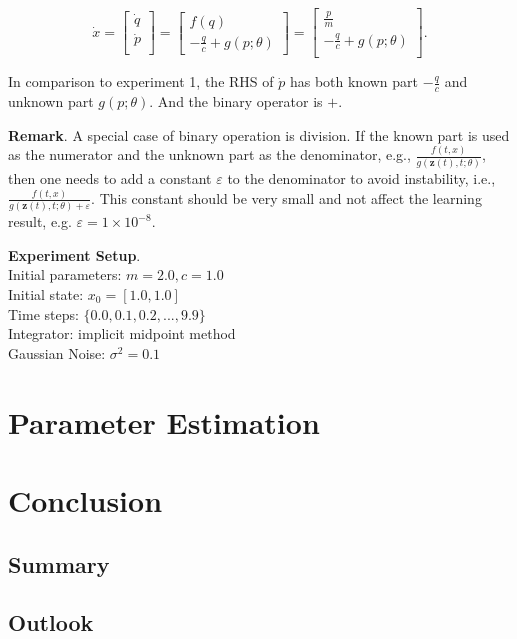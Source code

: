 \documentclass[
	parskip, 			   %
	twoside, 			   %
	DIV=14, 			   %
	BCOR=15.0mm, 		   %
	headsepline, 		   %
	open=right, 		   %
	captions=tableheading, %
	bibliography=totoc,    %
	numbers=noenddot       %
]{scrreprt}
\begin{document}
\begin{equation}
    \label{eq:structured_ODE_idho}
    \dot{x} =
    \begin{bmatrix}
    \dot{q}\\
    \dot{p}\\
    \end{bmatrix}
    =
    \begin{bmatrix}
    {f(q)}\\
    -\frac{q}{c} + {g(p;\theta)}
    \end{bmatrix}
    =
    \begin{bmatrix}
    \frac{p}{m}\\
    -\frac{q}{c} + {g(p;\theta)}\\
    \end{bmatrix}.
\end{equation}

In comparison to experiment 1, the RHS of $\dot{p}$ has both known part $-\frac{q}{c}$ and unknown part $g(p;\theta)$. And the binary operator is $+$.

\textbf{Remark}. A special case of binary operation is division. If the known part is used as the numerator and the unknown part as the denominator, e.g., $\frac{f(t, x)}{g(\mathbf{z}(t), t; \theta)}$, then one needs to add a constant $\varepsilon$ to the denominator to avoid instability, i.e., $\frac{f(t, x)}{g(\mathbf{z}(t), t; \theta) + \varepsilon}$. This constant should be very small and not affect the learning result, e.g. $\varepsilon = 1 \times 10^{-8}$.

\textbf{Experiment Setup}.\\
Initial parameters: $m = 2.0, c = 1.0$\\
Initial state: $x_0 = [1.0, 1.0]$\\
Time steps: $\{ 0.0, 0.1, 0.2, ..., 9.9 \}$\\
Integrator: implicit midpoint method\\
Gaussian Noise: $\sigma^2 = 0.1$

\clearpage
\chapter{Parameter Estimation}
\label{ch:chapter7}

\clearpage
\chapter{Conclusion}
\label{ch:chapter8}
\section{Summary}
\section{Outlook}



\renewcommand{\bibname}{References} %



\appendix
\end{document}
